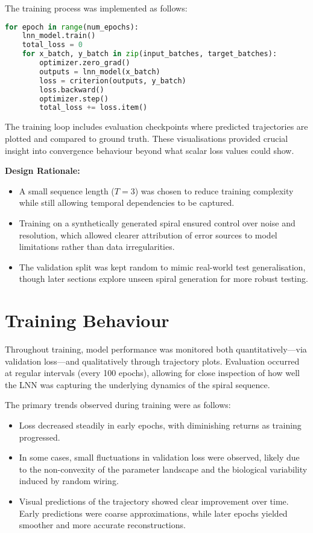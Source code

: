 \vspace{1em}
\noindent The training process was implemented as follows:
\begin{lstlisting}[language=Python, caption={Simplified training loop for the LNN}]
for epoch in range(num_epochs):
    lnn_model.train()
    total_loss = 0
    for x_batch, y_batch in zip(input_batches, target_batches):
        optimizer.zero_grad()
        outputs = lnn_model(x_batch)
        loss = criterion(outputs, y_batch)
        loss.backward()
        optimizer.step()
        total_loss += loss.item()
\end{lstlisting}

\vspace{0.5em}
\noindent The training loop includes evaluation checkpoints where predicted trajectories are plotted and compared to ground truth. These visualisations provided crucial insight into convergence behaviour beyond what scalar loss values could show.

\vspace{1em}
\noindent \textbf{Design Rationale:}
\begin{itemize}
    \item A small sequence length ($T = 3$) was chosen to reduce training complexity while still allowing temporal dependencies to be captured.
    \item Training on a synthetically generated spiral ensured control over noise and resolution, which allowed clearer attribution of error sources to model limitations rather than data irregularities.
    \item The validation split was kept random to mimic real-world test generalisation, though later sections explore unseen spiral generation for more robust testing.
\end{itemize}

\section{Training Behaviour}
Throughout training, model performance was monitored both quantitatively—via validation loss—and qualitatively through trajectory plots. Evaluation occurred at regular intervals (every 100 epochs), allowing for close inspection of how well the LNN was capturing the underlying dynamics of the spiral sequence.

\noindent The primary trends observed during training were as follows:
\begin{itemize}
    \item Loss decreased steadily in early epochs, with diminishing returns as training progressed.
    \item In some cases, small fluctuations in validation loss were observed, likely due to the non-convexity of the parameter landscape and the biological variability induced by random wiring.
    \item Visual predictions of the trajectory showed clear improvement over time. Early predictions were coarse approximations, while later epochs yielded smoother and more accurate reconstructions.
\end{itemize}

